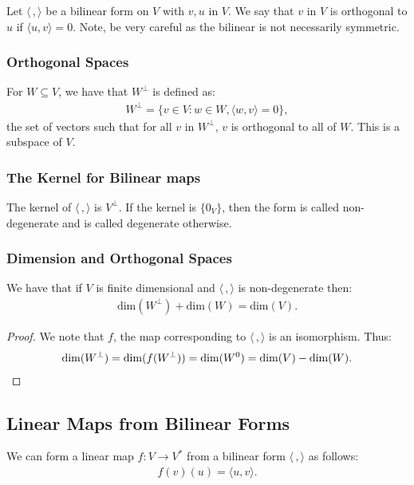 Let $\langle \, , \rangle$ be a bilinear form on $V$ with $v, u$ in $V$. We say that $v$ in $V$ is 
orthogonal to $u$ if $\langle u, v \rangle = 0$. Note, be very careful as the bilinear is not
necessarily symmetric.

\subsubsection{Orthogonal Spaces}

For $W \subseteq V$, we have that $W^\perp$ is defined as: \begin{gather*}
  W^\perp = \{v \in V : w \in W, \langle w, v \rangle = 0\},
\end{gather*} the set of vectors such that for all $v$ in $W^\perp$, $v$ is orthogonal
to all of $W$. This is a subspace of $V$.

\subsubsection{The Kernel for Bilinear maps}

The kernel of $\langle \, , \rangle$ is $V^\perp$. If the kernel is $\{0_V\}$,
then the form is called non-degenerate and is called degenerate otherwise.

\subsubsection{Dimension and Orthogonal Spaces}

We have that if $V$ is finite dimensional and $\langle \, , \rangle$ is non-degenerate
then: \begin{gather*}
  \text{dim}(W^\perp) + \text{dim}(W) = \text{dim}(V).
\end{gather*}
\begin{proof}
    We note that $f$, the map corresponding to $\langle \, , \rangle$
    is an isomorphism. Thus: \begin{gather*}
        \operatorname{dim}(W^\perp) = \operatorname{dim}(f(W^\perp)) = \operatorname{dim}(W^0) = \operatorname{dim}(V) - \operatorname{dim}(W). \qedhere
    \end{gather*}
\end{proof}

\subsection{Linear Maps from Bilinear Forms}

We can form a linear map $f : V \to V^*$ from a bilinear form $\langle \, , \rangle$ 
as follows: \begin{gather*}
  f(v)(u) = \langle u, v \rangle.
\end{gather*}

